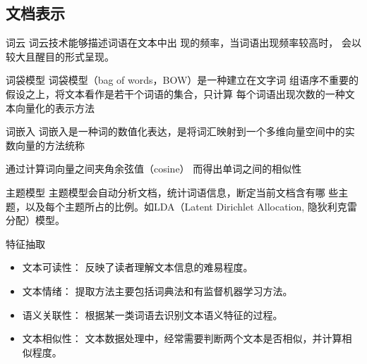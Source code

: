 \documentclass[t]{beamer}
\begin{document}
\subsection{文档表示}
\begin{frame}[fragile]{词云}
    词云技术能够描述词语在文本中出
    现的频率，当词语出现频率较高时，
    会以较大且醒目的形式呈现。

    
\end{frame}

\begin{frame}[fragile]{词袋模型}
    词袋模型（bag of words，BOW）是一种建立在文字词
    组语序不重要的假设之上，将文本看作是若干个词语的集合，只计算
    每个词语出现次数的一种文本向量化的表示方法
\end{frame}


\begin{frame}[fragile]{词嵌入}
    词嵌入是一种词的数值化表达，是将词汇映射到一个多维向量空间中的实数向量的方法统称

    通过计算词向量之间夹角余弦值（cosine）
    而得出单词之间的相似性
\end{frame}


\begin{frame}[fragile]{主题模型}
    主题模型会自动分析文档，统计词语信息，断定当前文档含有哪
    些主题，以及每个主题所占的比例。如LDA（Latent Dirichlet Allocation, 隐狄利克雷分配）模型。
\end{frame}

\begin{frame}[fragile]{特征抽取}
\begin{itemize}
    \item 文本可读性：
   反映了读者理解文本信息的难易程度。
    \item 文本情绪：
    提取方法主要包括词典法和有监督机器学习方法。
    \item 语义关联性：
    根据某一类词语去识别文本语义特征的过程。
    \item 文本相似性：
    文本数据处理中，经常需要判断两个文本是否相似，并计算相似程度。
\end{itemize}

    
\end{frame}
\end{document}
